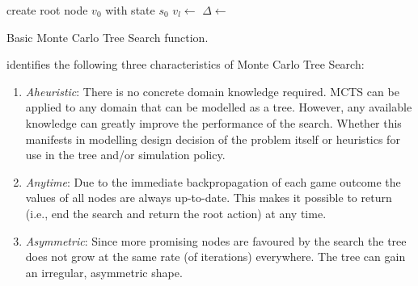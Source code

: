 \begin{algorithm}[htbp]
\begin{algorithmic}
    \State create root node $v_0$ with state $s_0$
    \State $v_l \gets$  
    \State $\Delta \gets$  
    \State {}
    \EndWhile
    \State \Return {} 
\EndFunction
\end{algorithmic}
\caption{Basic Monte Carlo Tree Search function.}
\label{alg:mcts_basic}
\end{algorithm}
\cite{browne2012survey} identifies the following three characteristics of Monte Carlo Tree Search:
\begin{enumerate}[label=\alph*)]
    \item \textit{Aheuristic}: There is no concrete domain knowledge required. MCTS can be applied to any domain that can be modelled as a tree. However, any available knowledge can greatly improve the performance of the search. Whether this manifests in modelling design decision of the problem itself or heuristics for use in the tree and/or simulation policy.   
    \item \textit{Anytime}: Due to the immediate backpropagation of each game outcome the values of all nodes are always up-to-date. This makes it possible to return (i.e., end the search and return the root action) at any time.
    \item \textit{Asymmetric}: Since more promising nodes are favoured by the search the tree does not grow at the same rate (of iterations) everywhere. The tree can gain an irregular, asymmetric shape.
\end{enumerate}
